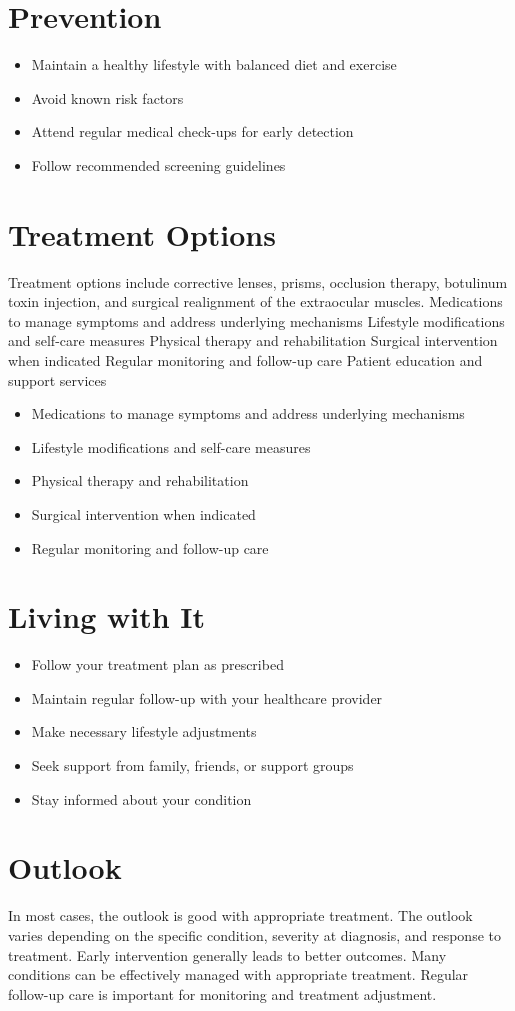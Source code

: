 \section{Prevention}
\begin{itemize}[noitemsep]
  \item Maintain a healthy lifestyle with balanced diet and exercise
  \item Avoid known risk factors
  \item Attend regular medical check-ups for early detection
  \item Follow recommended screening guidelines
\end{itemize}
\section{Treatment Options}
Treatment options include corrective lenses, prisms, occlusion therapy, botulinum toxin injection, and surgical realignment of the extraocular muscles. Medications to manage symptoms and address underlying mechanisms Lifestyle modifications and self-care measures Physical therapy and rehabilitation Surgical intervention when indicated Regular monitoring and follow-up care Patient education and support services

\begin{itemize}[noitemsep]
  \item Medications to manage symptoms and address underlying mechanisms
  \item Lifestyle modifications and self-care measures
  \item Physical therapy and rehabilitation
  \item Surgical intervention when indicated
  \item Regular monitoring and follow-up care
\end{itemize}
\section{Living with It}
\begin{itemize}[noitemsep]
  \item Follow your treatment plan as prescribed
  \item Maintain regular follow-up with your healthcare provider
  \item Make necessary lifestyle adjustments
  \item Seek support from family, friends, or support groups
  \item Stay informed about your condition
\end{itemize}
\section{Outlook}
In most cases, the outlook is good with appropriate treatment. The outlook varies depending on the specific condition, severity at diagnosis, and response to treatment. Early intervention generally leads to better outcomes. Many conditions can be effectively managed with appropriate treatment. Regular follow-up care is important for monitoring and treatment adjustment.
